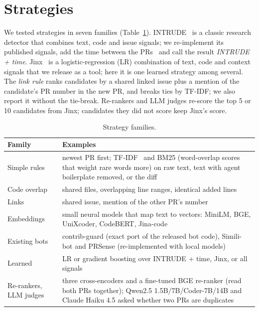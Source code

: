 \documentclass[10pt,conference]{IEEEtran}
\begin{document}
\section{Strategies}
We tested \nStrategies{} strategies in seven families (Table~\ref{tab:families}). INTRUDE~\cite{ren2019intrude} is a classic research detector that combines text, code and issue signals; we re-implement its published signals, add the time between the PRs~\cite{wang2019time} and call the result \emph{INTRUDE + time}. Jinx~\cite{jinxtool} is a logistic-regression (LR) combination of text, code and context signals that we release as a tool; here it is one learned strategy among several. The \emph{link rule} ranks candidates by a shared linked issue plus a mention of the candidate's PR number in the new PR, and breaks ties by TF-IDF; we also report it without the tie-break. Re-rankers and LLM judges re-score the top 5 or 10 candidates from Jinx; candidates they did not score keep Jinx's score.

\begin{table}[t]\centering\caption{Strategy families.}\label{tab:families}
\small\begin{tabular}{@{}p{}p{}@{}}\toprule
Family & Examples\\\midrule
Simple rules & newest PR first; TF-IDF~\cite{li2017detecting} and BM25 (word-overlap scores that weight rare words more) on raw text, text with agent boilerplate removed, or the diff\\
Code overlap & shared files, overlapping line ranges, identical added lines\\
Links & shared issue, mention of the other PR's number\\
Embeddings & small neural models that map text to vectors: MiniLM, BGE, UniXcoder, CodeBERT, Jina-code\\
Existing bots & contrib-guard (exact port of the released bot code), Simili-bot and PRSense (re-implemented with local models)\\
Learned & LR or gradient boosting over INTRUDE + time, Jinx, or all signals\\
Re-rankers, LLM judges & three cross-encoders and a fine-tuned BGE re-ranker (read both PRs together); Qwen2.5 1.5B/7B/Coder-7B/14B and Claude Haiku 4.5 asked whether two PRs are duplicates\\\bottomrule
\end{tabular}\end{table}
\end{document}
